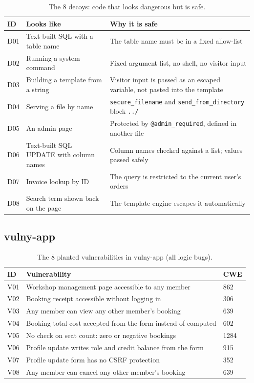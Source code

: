 \documentclass[11pt,a4paper]{article}
\newcommand{\code}[1]{\texttt{#1}}
\begin{document}
\begin{table}[H]
\centering
\small
\caption{The 8 decoys: code that looks dangerous but is safe.}
\begin{tabularx}{\linewidth}{@{}l >{\raggedright\arraybackslash}p{5.2cm} Y@{}}
\toprule
\textbf{ID} & \textbf{Looks like} & \textbf{Why it is safe} \\
\midrule
D01 & Text-built SQL with a table name & The table name must be in a fixed allow-list \\
D02 & Running a system command & Fixed argument list, no shell, no visitor input \\
D03 & Building a template from a string & Visitor input is passed as an escaped variable, not pasted into the template \\
D04 & Serving a file by name & \code{secure\_filename} and \code{send\_from\_directory} block \code{../} \\
D05 & An admin page & Protected by \code{@admin\_required}, defined in another file \\
D06 & Text-built SQL UPDATE with column names & Column names checked against a list; values passed safely \\
D07 & Invoice lookup by ID & The query is restricted to the current user's orders \\
D08 & Search term shown back on the page & The template engine escapes it automatically \\
\bottomrule
\end{tabularx}
\end{table}

\subsection{vulny-app}
\label{app:vulny}

\begin{table}[H]
\centering
\small
\caption{The 8 planted vulnerabilities in vulny-app (all logic bugs).}
\begin{tabular}{@{}l l l@{}}
\toprule
\textbf{ID} & \textbf{Vulnerability} & \textbf{CWE} \\
\midrule
V01 & Workshop management page accessible to any member & 862 \\
V02 & Booking receipt accessible without logging in & 306 \\
V03 & Any member can view any other member's booking & 639 \\
V04 & Booking total cost accepted from the form instead of computed & 602 \\
V05 & No check on seat count: zero or negative bookings & 1284 \\
V06 & Profile update writes role and credit balance from the form & 915 \\
V07 & Profile update form has no CSRF protection & 352 \\
V08 & Any member can cancel any other member's booking & 639 \\
\bottomrule
\end{tabular}
\end{table}
\end{document}
